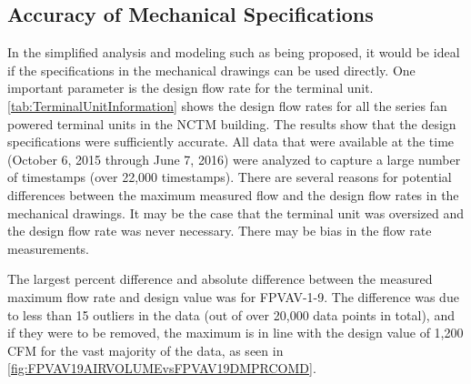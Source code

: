\subsection{Accuracy of Mechanical Specifications}

In the simplified analysis and modeling such as being proposed, it would be
ideal if the specifications in the mechanical drawings can be used
directly.  One important parameter is the design flow rate for the
terminal unit.  \tableref \ref{tab:TerminalUnitInformation} shows the
design flow rates for all the series fan powered terminal units in the
NCTM building.  The results show that the design specifications were
sufficiently accurate.  All data that were available at the time
(October 6, 2015 through June 7, 2016) were analyzed to capture a large
number of timestamps (over 22,000 timestamps).  There are several
reasons for potential differences between the maximum measured flow and
the design flow rates in the mechanical drawings.  It may be the case
that the terminal unit was oversized and the design flow rate was never
necessary. There may be bias in the flow rate measurements.  

The largest percent difference and absolute difference between the
measured maximum flow rate and design value was for FPVAV-1-9. The
difference was due to less than 15 outliers in the data (out of over
20,000 data points in total), and if they were to be removed, the
maximum is in line with the design value of 1,200 CFM for the vast
majority of the data, as seen in \figref{}
\ref{fig:FPVAV19AIRVOLUMEvsFPVAV19DMPRCOMD}. 

